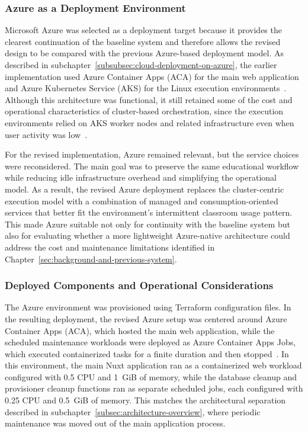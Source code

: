 \subsubsection{Azure as a Deployment Environment} \label{subsubsec:azure-as-a-deployment-environment}
Microsoft Azure was selected as a deployment target because it provides the clearest continuation of the baseline system and therefore allows the revised design to be compared with the previous Azure-based deployment model.
As described in subchapter~\ref{subsubsec:cloud-deployment-on-azure}, the earlier implementation used Azure Container Apps (ACA) for the main web application and Azure Kubernetes Service (AKS) for the Linux execution environments~\cite{eistre_2024}.
Although this architecture was functional, it still retained some of the cost and operational characteristics of cluster-based orchestration, since the execution environments relied on AKS worker nodes and related infrastructure even when user activity was low~\cite{eistre_2024}.

For the revised implementation, Azure remained relevant, but the service choices were reconsidered.
The main goal was to preserve the same educational workflow while reducing idle infrastructure overhead and simplifying the operational model.
As a result, the revised Azure deployment replaces the cluster-centric execution model with a combination of managed and consumption-oriented services that better fit the environment's intermittent classroom usage pattern.
This made Azure suitable not only for continuity with the baseline system but also for evaluating whether a more lightweight Azure-native architecture could address the cost and maintenance limitations identified in Chapter~\ref{sec:background-and-previous-system}.

\subsubsection{Deployed Components and Operational Considerations} \label{subsubsec:deployed-components-and-operational-considerations-azure}
The Azure environment was provisioned using Terraform configuration files.
In the resulting deployment, the revised Azure setup was centered around Azure Container Apps (ACA), which hosted the main web application, while the scheduled maintenance workloads were deployed as Azure Container Apps Jobs, which executed containerized tasks for a finite duration and then stopped~\cite{microsoft_azure_container_apps_overview_2026,microsoft_azure_container_apps_jobs_2026}.
In this environment, the main Nuxt application ran as a containerized web workload configured with 0.5 CPU and 1~GiB of memory, while the database cleanup and provisioner cleanup functions ran as separate scheduled jobs, each configured with 0.25 CPU and 0.5~GiB of memory.
This matches the architectural separation described in subchapter~\ref{subsec:architecture-overview}, where periodic maintenance was moved out of the main application process.

